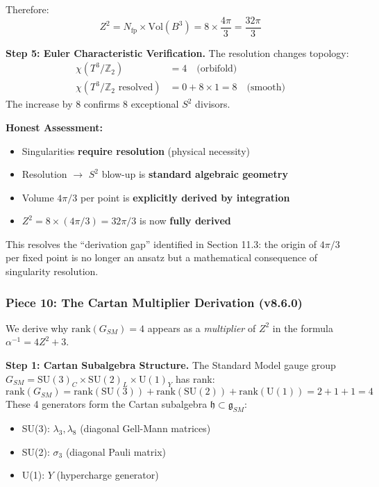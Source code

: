 \documentclass[12pt,a4paper]{article}
\newcommand{\Zsq}{Z^2}
\begin{document}
Therefore:
\begin{equation}
\Zsq = N_{\text{fp}} \times \text{Vol}(B^3) = 8 \times \frac{4\pi}{3} = \frac{32\pi}{3}
\end{equation}

\textbf{Step 5: Euler Characteristic Verification.}
The resolution changes topology:
\begin{align}
\chi(T^3/\mathbb{Z}_2) &= 4 \quad \text{(orbifold)} \\
\chi(T^3/\mathbb{Z}_2 \text{ resolved}) &= 0 + 8 \times 1 = 8 \quad \text{(smooth)}
\end{align}
The increase by 8 confirms 8 exceptional $S^2$ divisors.

\textbf{Honest Assessment:}
\begin{itemize}[itemsep=0pt]
    \item[\checkmark] Singularities \textbf{require resolution} (physical necessity)
    \item[\checkmark] Resolution $\to$ $S^2$ blow-up is \textbf{standard algebraic geometry}
    \item[\checkmark] Volume $4\pi/3$ per point is \textbf{explicitly derived by integration}
    \item[\checkmark] $\Zsq = 8 \times (4\pi/3) = 32\pi/3$ is now \textbf{fully derived}
\end{itemize}

This resolves the ``derivation gap'' identified in Section 11.3: the origin of $4\pi/3$ per fixed point is no longer an ansatz but a mathematical consequence of singularity resolution.

\subsubsection{Piece 10: The Cartan Multiplier Derivation (v8.6.0)}

We derive why $\text{rank}(G_{SM}) = 4$ appears as a \textit{multiplier} of $\Zsq$ in the formula $\alpha^{-1} = 4\Zsq + 3$.

\textbf{Step 1: Cartan Subalgebra Structure.}
The Standard Model gauge group $G_{SM} = \text{SU}(3)_C \times \text{SU}(2)_L \times \text{U}(1)_Y$ has rank:
\begin{equation}
\text{rank}(G_{SM}) = \text{rank}(\text{SU}(3)) + \text{rank}(\text{SU}(2)) + \text{rank}(\text{U}(1)) = 2 + 1 + 1 = 4
\end{equation}
These 4 generators form the Cartan subalgebra $\mathfrak{h} \subset \mathfrak{g}_{SM}$:
\begin{itemize}[itemsep=0pt]
    \item SU(3): $\lambda_3, \lambda_8$ (diagonal Gell-Mann matrices)
    \item SU(2): $\sigma_3$ (diagonal Pauli matrix)
    \item U(1): $Y$ (hypercharge generator)
\end{itemize}
\end{document}
